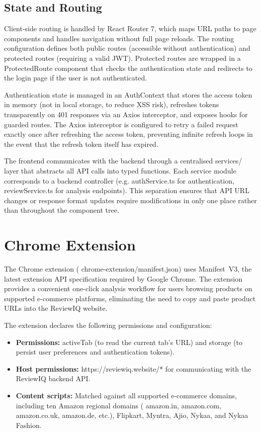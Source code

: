 \documentclass[12pt,a4paper,oneside]{report}
\renewcommand{\texttt}[1]{%
  {\ttfamily\hyphenchar\font=45\relax #1}}
\begin{document}
\subsection{State and Routing}
Client-side routing is handled by React Router 7, which maps URL paths
to page components and handles navigation without full page reloads. The
routing configuration defines both public routes (accessible without
authentication) and protected routes (requiring a valid JWT). Protected
routes are wrapped in a \texttt{ProtectedRoute} component that checks
the authentication state and redirects to the login page if the user is
not authenticated.

Authentication state is managed in an \texttt{AuthContext} that stores
the access token in memory (not in local storage, to reduce XSS risk),
refreshes tokens transparently on 401 responses via an Axios interceptor,
and exposes hooks for guarded routes. The Axios interceptor is configured
to retry a failed request exactly once after refreshing the access token,
preventing infinite refresh loops in the event that the refresh token
itself has expired.

The frontend communicates with the backend through a centralised
\texttt{services/} layer that abstracts all API calls into typed
functions. Each service module corresponds to a backend controller
(e.g. \texttt{authService.ts} for authentication, \texttt{reviewService.ts}
for analysis endpoints). This separation ensures that API URL changes or
response format updates require modifications in only one place rather
than throughout the component tree.

\section{Chrome Extension}
The Chrome extension (\texttt{chrome-extension/manifest.json}) uses
Manifest~V3, the latest extension API specification required by Google
Chrome. The extension provides a convenient one-click analysis workflow
for users browsing products on supported e-commerce platforms, eliminating
the need to copy and paste product URLs into the ReviewIQ website.

The extension declares the following permissions and configuration:

\begin{itemize}[leftmargin=*]
  \item \textbf{Permissions:} \texttt{activeTab} (to read the current
        tab's URL) and \texttt{storage} (to persist user preferences and
        authentication tokens).
  \item \textbf{Host permissions:}
        \texttt{https://reviewiq.website/*} for communicating with the
        ReviewIQ backend API.
  \item \textbf{Content scripts:} Matched against all supported
        e-commerce domains, including ten Amazon regional domains
        (\texttt{amazon.in}, \texttt{amazon.com}, \texttt{amazon.co.uk},
        \texttt{amazon.de}, etc.), Flipkart, Myntra, Ajio, Nykaa, and
        Nykaa Fashion.
\end{itemize}
\end{document}
